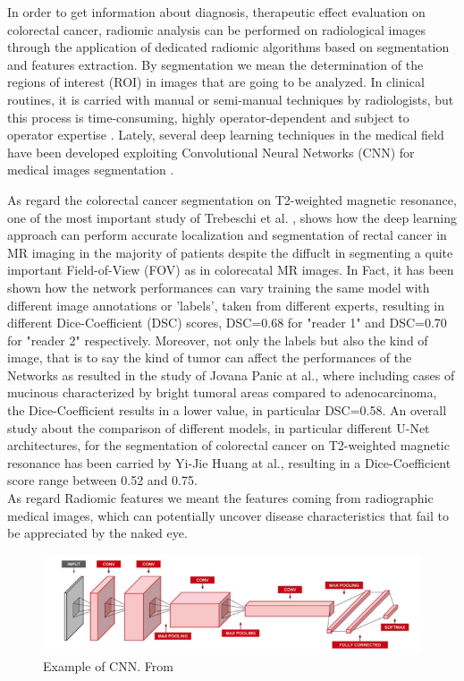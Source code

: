\documentclass[12pt,a4paper]{report}
\begin{document}
In order to get information about diagnosis, therapeutic effect evaluation on colorectal cancer, radiomic analysis can be performed on radiological images through the application of dedicated radiomic algorithms based on segmentation and features extraction. By segmentation we mean the determination of the regions of interest (ROI) in images that are going to be analyzed. In clinical routines, it is carried with manual or semi-manual techniques by radiologists, but this process is time-consuming, highly operator-dependent and subject to operator expertise \cite{jovana, tesicoppola,Trebeschi2017}. Lately, several deep learning techniques in the medical field have been developed exploiting Convolutional Neural Networks (CNN) for medical images segmentation \cite{Trebeschi2017, jovana, tesicoppola}. 

As regard the colorectal cancer segmentation on T2-weighted magnetic resonance, one of the most important study of Trebeschi et al. \cite{Trebeschi2017}, shows how the deep learning approach can perform accurate localization and segmentation of rectal cancer in MR imaging in the majority of patients despite the diffuclt in segmenting a quite important Field-of-View (FOV) as in colorecatal MR images. In Fact, it has been shown how the network performances can vary training the same model with different image annotations or 'labels', taken from different experts, resulting in different Dice-Coefficient (DSC) scores, DSC=0.68 for "reader 1" and DSC=0.70 for "reader 2" respectively. Moreover, not only the labels but also the kind of image, that is to say the kind of tumor can affect the performances of the Networks as resulted in the study of Jovana Panic at al.\cite{panic}, where including cases of mucinous characterized by bright tumoral areas compared to adenocarcinoma, the Dice-Coefficient results in a lower value, in particular DSC=0.58. An overall study about the comparison of different models, in particular different U-Net architectures, for the segmentation of colorectal cancer on T2-weighted magnetic resonance has been carried by Yi-Jie Huang at al.\cite{Huang_2020}, resulting in a Dice-Coefficient score range between 0.52 and 0.75.\\
As regard Radiomic features we meant the features coming from radiographic medical images, which can potentially uncover disease characteristics that fail to be appreciated by the naked eye\cite{wiki:Radiomics}.  
\\
\begin{figure}[htp]
	\centering
	\includegraphics[width=0.9\linewidth]{images/TrebeschiCNN.png}
	\caption{Example of CNN. From \cite{Trebeschi2017} }
\end{figure}
\end{document}
